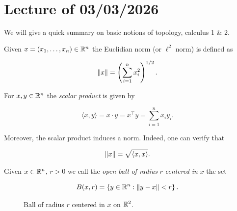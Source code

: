 \chapter{Lecture \thechapter{} of 03/03/2026}

We will give a quick summary on basic notions of topology, calculus 1 \& 2.

\begin{definition}
    
    Given $x = (x_1, \dots, x_n) \in {\mathbb{R}^n}$ the Euclidian norm (or $\ell^2$ norm) is defined as 

    \[ \lVert x \rVert = \left(\sum_{i = 1}^n x_i^2\right)^{1/2}. \]

    For $x,y \in {\mathbb{R}^n}$ the \emph{scalar product} is given by 

    \[ \langle x,y \rangle = x \cdot y = x^\top y = \sum_{i = 1}^n x_i y_i. \] 

    Moreover, the scalar product induces a norm. Indeed, one can verify that 

    \[ \lVert x \rVert = \sqrt{\langle x,x\rangle}. \]

\end{definition}

\begin{definition}
    
    Given $x \in {\mathbb{R}^n}$, $r > 0$ we call the \emph{open ball of radius} $r$ \emph{centered in } $x$ the set 

    \[ B(x,r) = \left\{ y \in {\mathbb{R}^n} : \lVert y - x \rVert < r \right\}. \] 

\end{definition}

\begin{figure}[ht!]

    \centering
    

    \caption{Ball of radius $r$ centered in $x$ on $\mathbb{R}^2$.}

\end{figure}

